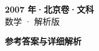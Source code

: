 \documentclass[zihao=-4, a4paper]{ctexart}
\begin{document}
\begin{center}
  {\Large\bfseries 2007 年·北京卷·文科}\\[4pt]
  {\large 数学 · 解析版}
\end{center}
\medskip
{}

\clearpage
{}
\begin{center}{\Large\bfseries 参考答案与详细解析}\end{center}
\medskip

\end{document}
